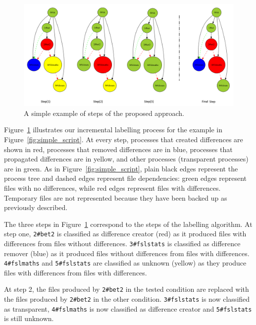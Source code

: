 \documentclass[a4paper,num-refs]{oup-contemporary}
\begin{document}
\begin{figure}
  \centering
  \includegraphics[width=\columnwidth]{images/iterative_modif}
  \caption{A simple example of steps of the proposed approach.}
  \label{fig:iterations}
\end{figure}

Figure~\ref{fig:iterations} illustrates our incremental labelling 
process for the example in Figure~\ref{fig:simple_script}. At every 
step, processes that created differences are shown in red, processes that 
removed differences are in blue, processes that propagated differences are in 
yellow, and other processes (transparent processes) are in green. As in 
Figure~\ref{fig:simple_script}, plain black edges represent the process 
tree and dashed edges represent file dependencies: green edges 
represent files with no differences, while red edges represent files with 
differences. Temporary files are not represented because they have been 
backed up as previously described.

The three steps in Figure~\ref{fig:iterations} correspond to the 
steps of the labelling algorithm. At step one, \texttt{2\#bet2} 
is classified as difference creator (red) as it produced files with differences 
from files without differences. \texttt{3\#fslstats} is classified as difference  
remover (blue) as it produced files without differences from files with 
differences. \texttt{4\#fslmaths} and \texttt{5\#fslstats} are classified as 
unknown (yellow) as they produce files with differences from files with 
differences.

At step 2, the files produced by \texttt{2\#bet2} in the tested 
condition are replaced with the files produced by \texttt{2\#bet2} in 
the other condition. \texttt{3\#fslstats} is now classified as 
transparent, \texttt{4\#fslmaths} is now classified as difference creator 
and \texttt{5\#fslstats} is still unknown.
\end{document}
